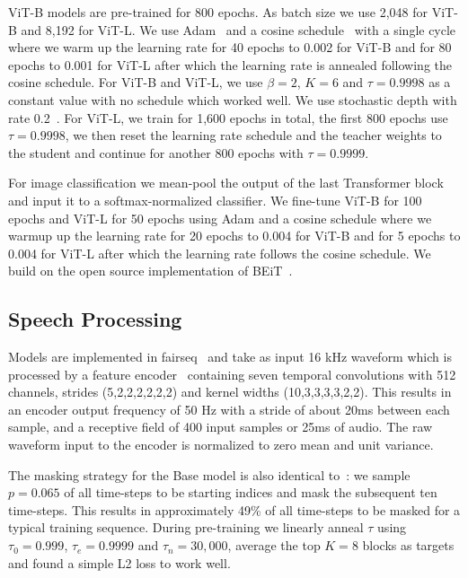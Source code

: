 \documentclass[nohyperref]{article}
\theoremstyle{plain}
\theoremstyle{definition}
\theoremstyle{remark}
\begin{document}
ViT-B models are pre-trained for 800 epochs.
As batch size we use 2,048 for ViT-B and 8,192 for ViT-L.
We use Adam~\citep{kingma2015adam} and a cosine schedule~\citep{loshchilov2016cosine} with a single cycle where we warm up the learning rate for 40 epochs to 0.002 for ViT-B and for 80 epochs to 0.001 for ViT-L after which the learning rate is annealed following the cosine schedule.
For ViT-B and ViT-L, we use $\beta=2$, $K=6$ and $\tau = 0.9998$ as a constant value with no schedule which worked well.
We use stochastic depth with rate 0.2~\citep{huang2016deep}.
For ViT-L, we train for 1,600 epochs in total, the first 800 epochs use $\tau=0.9998$, we then reset the learning rate schedule and the teacher weights to the student and continue for another 800 epochs with $\tau=0.9999$.

For image classification we mean-pool the output of the last Transformer block and input it to a softmax-normalized classifier.
We fine-tune ViT-B for 100 epochs and ViT-L for 50 epochs using Adam and a cosine schedule where we warmup up the learning rate for 20 epochs to 0.004 for ViT-B and for 5 epochs to 0.004 for ViT-L after which the learning rate follows the cosine schedule. 
We build on the open source implementation of BEiT~\citep{bao2021beit}.

\subsection{Speech Processing}
\label{sec:setup_speech}

Models are implemented in fairseq~\cite{ott2019fairseq} and take as input 16 kHz waveform which is processed by a feature encoder~\citep{baevski2020wav} containing seven temporal convolutions with 512 channels, strides (5,2,2,2,2,2,2) and kernel widths (10,3,3,3,3,2,2).
This results in an encoder output frequency of 50 Hz with a stride of about 20ms between each sample, and a receptive field of 400 input samples or 25ms of audio. 
The raw waveform input to the encoder is normalized to zero mean and unit variance.

The masking strategy for the Base model is also identical to~\citet{baevski2020wav}: we sample $p=0.065$ of all time-steps to be starting indices and mask the subsequent ten time-steps.
This results in approximately 49\% of all time-steps to be masked for a typical training sequence.
During pre-training we linearly anneal $\tau$ using $\tau_0=0.999$, $\tau_e=0.9999$ and $\tau_n=30,000$, average the top $K=8$ blocks as targets and found a simple L2 loss to work well.
\end{document}
